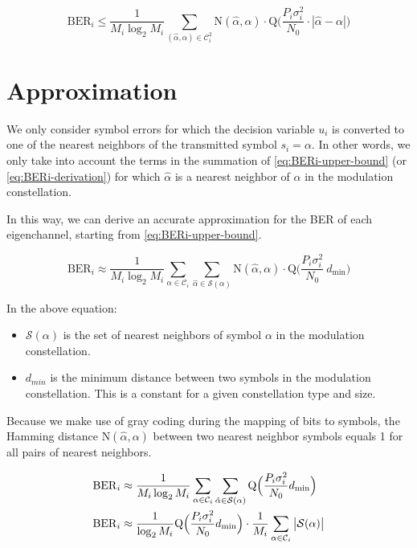 \documentclass[a4paper,12pt]{article}
\begin{document}
\begin{equation}
    \mathrm{BER}_i \leq \frac{1}{M_i \log_2{M_i}} \sum_{(\hat{\alpha}, \alpha) \in \mathcal{C}^{2}_i} \mathrm{N}(\hat{\alpha}, \alpha) \cdot \mathrm{Q} \Big(  \frac{P_i \sigma^{2}_i}{N_0} \cdot |\hat{\alpha} - \alpha| \Big) \label{eq:BERi-upper-bound}
\end{equation}


\section{Approximation}

We only consider symbol errors for which the decision variable $ u_i $ is converted to one of the nearest neighbors of the transmitted symbol $ s_i = \alpha $. 
In other words, we only take into account the terms in the summation of \autoref{eq:BERi-upper-bound} (or \autoref{eq:BERi-derivation}) for which $ \hat{\alpha} $ is a nearest neighbor of $ \alpha $ in the modulation constellation. \smallskip

\noindent In this way, we can derive an accurate approximation for the BER of each eigenchannel, starting from \autoref{eq:BERi-upper-bound}.

\begin{equation}
    \mathrm{BER}_i \approx \frac{1}{M_i \log_2{M_i}} \sum_{\alpha \in \mathcal{C}_i} \sum_{\hat{\alpha} \in \mathcal{S(\alpha)}} \mathrm{N}(\hat{\alpha}, \alpha) \cdot \mathrm{Q} \Big(  \frac{P_i \sigma^{2}_i}{N_0} \ d_{\text{min}} \Big)
\end{equation}

\noindent In the above equation:
\begin{itemize}

    \item $ \mathcal{S(\alpha)} $ is the set of nearest neighbors of symbol $\alpha$ in the modulation constellation.
    
    \item $ d_{min} $ is the minimum distance between two symbols in the modulation constellation. This is a constant for a given constellation type and size.

\end{itemize}

\noindent Because we make use of gray coding during the mapping of bits to symbols, the Hamming distance $ \mathrm{N}(\hat{\alpha}, \alpha) $ between two nearest neighbor symbols equals 1 for all pairs of nearest neighbors.

\begin{align}
    \mathrm{BER}_i &\approx \frac{1}{M_i \log_2{M_i}} \sum_{\alpha \in \mathcal{C}_i} \sum_{\hat{\alpha} \in \mathcal{S(\alpha)}} \mathrm{Q} \Big(  \frac{P_i \sigma^{2}_i}{N_0}  d_{\text{min}} \Big) \notag \\
    \mathrm{BER}_i &\approx \frac{1}{\log_2{M_i}}  \mathrm{Q} \Big(  \frac{P_i \sigma^{2}_i}{N_0}  d_{\text{min}} \Big) \cdot \frac{1}{M_i} \sum_{\alpha \in \mathcal{C}_i} \big| \mathcal{S(\alpha)} \big| \label{eq:BERi-approximation-with-sum}
\end{align}
\end{document}
